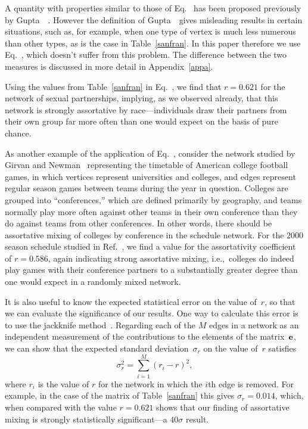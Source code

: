 \documentclass[twocolumn,pre]{revtex4}
\begin{document}
A quantity with properties similar to those of Eq.~ has been
proposed previously by Gupta~\etal~\cite{GAM89}.  However the definition of
Gupta~\etal\ gives misleading results in certain situations, such as, for
example, when one type of vertex is much less numerous than other types, as
is the case in Table~\ref{sanfran}.  In this paper therefore we use
Eq.~, which doesn't suffer from this problem.  The difference
between the two measures is discussed in more detail in
Appendix~\ref{appa}.

Using the values from Table~\ref{sanfran} in Eq.~, we find that
$r=0.621$ for the network of sexual partnerships, implying, as we observed
already, that this network is strongly assortative by race---individuals
draw their partners from their own group far more often than one would
expect on the basis of pure chance.

As another example of the application of Eq.~, consider the
network studied by Girvan and Newman~\cite{GN02} representing the timetable
of American college football games, in which vertices represent
universities and colleges, and edges represent regular season games between
teams during the year in question.  Colleges are grouped into
``conferences,'' which are defined primarily by geography, and teams
normally play more often against other teams in their own conference than
they do against teams from other conferences.  In other words, there should
be assortative mixing of colleges by conference in the schedule network.
For the 2000 season schedule studied in Ref.~, we find a
value for the assortativity coefficient of $r=0.586$, again indicating
strong assortative mixing, i.e.,~colleges do indeed play games with their
conference partners to a substantially greater degree than one would expect
in a randomly mixed network.

It is also useful to know the expected statistical error on the value
of~$r$, so that we can evaluate the significance of our results.  One way
to calculate this error is to use the jackknife method~\cite{Efron79}.
Regarding each of the $M$ edges in a network as an independent measurement
of the contributions to the elements of the matrix~$\mathbf{e}$, we can show that
the expected standard deviation~$\sigma_r$ on the value of~$r$ satisfies
\begin{equation}
\sigma_r^2 = \sum_{i=1}^M (r_i-r)^2,
\label{jackknife}
\end{equation}
where $r_i$ is the value of $r$ for the network in which the $i$th edge is
removed.  For example, in the case of the matrix of Table~\ref{sanfran}
this gives $\sigma_r=0.014$, which, when compared with the value $r=0.621$
shows that our finding of assortative mixing is strongly statistically
significant---a $40\sigma$ result.
\end{document}
